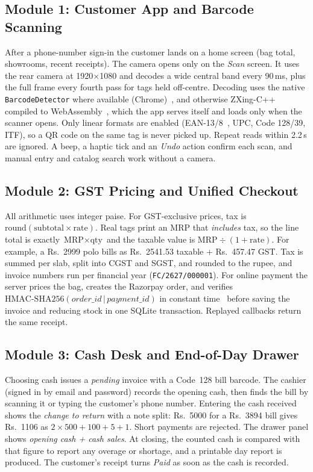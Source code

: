 \documentclass[12pt,letterpaper,twoside,openany]{report}
\begin{document}
\subsection{Module 1: Customer App and Barcode Scanning}
After a phone-number sign-in the customer lands on a home screen (bag total, showrooms,
recent receipts). The camera opens only on the \emph{Scan} screen. It uses the rear camera
at 1920$\times$1080 and decodes a wide central band every 90\,ms, plus the full frame every
fourth pass for tags held off-centre. Decoding uses the native \texttt{BarcodeDetector}
where available (Chrome)~\cite{shapedetect}, and otherwise ZXing-C++ compiled to
WebAssembly~\cite{zxing}, which the app serves itself and loads only when the scanner opens.
Only linear formats are enabled (EAN-13/8~\cite{gs1}, UPC, Code 128/39, ITF), so a QR code on
the same tag is never picked up. Repeat reads within 2.2\,s are ignored. A beep, a haptic
tick and an \emph{Undo} action confirm each scan, and manual entry and catalog search
work without a camera.

\subsection{Module 2: GST Pricing and Unified Checkout}
All arithmetic uses integer paise. For GST-exclusive prices, tax is
$\mathrm{round}(\text{subtotal}\times\text{rate})$. Real tags print an MRP that
\emph{includes} tax, so the line total is exactly $\text{MRP}\times\text{qty}$ and the taxable
value is $\text{MRP}\div(1+\text{rate})$. For example, a Rs.~2999 polo bills as Rs.~2541.53
taxable + Rs.~457.47 GST. Tax is summed per slab, split into CGST and SGST, and rounded to
the rupee, and invoice numbers run per financial year (\texttt{FC/2627/000001}). For online
payment the server prices the bag, creates the Razorpay order, and verifies
$\text{HMAC-SHA256}(\textit{order\_id}\,|\,\textit{payment\_id})$ in constant
time~\cite{hmac,razorpay} before saving the invoice and reducing stock in one SQLite
transaction. Replayed callbacks return the same receipt.

\subsection{Module 3: Cash Desk and End-of-Day Drawer}
Choosing cash issues a \emph{pending} invoice with a Code~128 bill barcode. The cashier
(signed in by email and password) records the opening cash, then finds the bill by scanning
it or typing the customer's phone number. Entering the cash received shows the
\emph{change to return} with a note split: Rs.~5000 for a Rs.~3894 bill gives Rs.~1106 as
$2\times500+100+5+1$. Short payments are rejected. The drawer panel shows
\emph{opening cash + cash sales}. At closing, the counted cash is compared with that figure
to report any overage or shortage, and a printable day report is produced. The customer's
receipt turns \emph{Paid} as soon as the cash is recorded.
\end{document}
